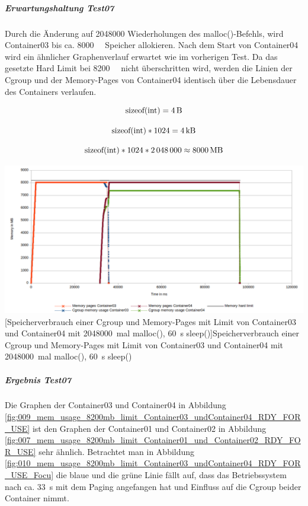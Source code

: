 \vspace{1em}


\subparagraph{Erwartungshaltung Test07}
Durch die Änderung auf \SI{2048000}{} Wiederholungen des malloc()-Befehls, wird Container03 bis ca. \SI{8000}{\mega\byte} Speicher allokieren. Nach dem Start von Container04 wird ein ähnlicher Graphenverlauf erwartet wie im vorherigen Test. Da das gesetzte Hard Limit bei \SI{8200}{\mega\byte} nicht überschritten wird, werden die Linien der Cgroup und der Memory-Pages von Container04 identisch über die Lebensdauer des Containers verlaufen.

\[\mathrm{sizeof(int)} = \SI{4}{\byte}\]

\[\mathrm{sizeof(int)} * \SI{1024}{} = \SI{4}{\kilo\byte}\]

\[\mathrm{sizeof(int)} * \SI{1024}{} * \SI{2048000}{} \approx \SI{8000}{\mega\byte} \]

\vspace{1em}
\begin{minipage}{\linewidth}
	\centering
	\includegraphics[width=1\linewidth]{pics/009_mem_usage_8200mb_limit_Container03_undContainer04_RDY_FOR_USE.png}
	[Speicherverbrauch einer Cgroup und Memory-Pages mit Limit von Container03 und Container04 mit \SI{2048000}{mal} malloc(), \SI{60}{\second} sleep()]{Speicherverbrauch einer Cgroup und Memory-Pages mit Limit von Container03 und Container04 mit \SI{2048000}{mal} malloc(), \SI{60}{\second} sleep()}
	\label{fig:009_mem_usage_8200mb_limit_Container03_undContainer04_RDY_FOR_USE}
\end{minipage}

\subparagraph{Ergebnis Test07}
Die Graphen der Container03 und Container04 in Abbildung \ref{fig:009_mem_usage_8200mb_limit_Container03_undContainer04_RDY_FOR_USE} ist den Graphen der Container01 und Container02 in Abbildung \ref{fig:007_mem_usage_8200mb_limit_Container01_und_Container02_RDY_FOR_USE} sehr ähnlich. Betrachtet man in Abbildung \ref{fig:010_mem_usage_8200mb_limit_Container03_undContainer04_RDY_FOR_USE_Focu} die blaue und die grüne Linie fällt auf, dass das Betriebssystem nach ca. \SI{33}{\second} mit dem Paging angefangen hat und Einfluss auf die Cgroup beider Container nimmt.  

